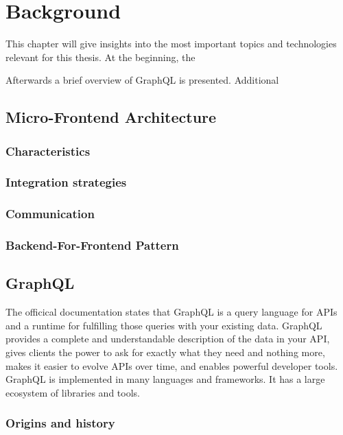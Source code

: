 \chapter{Background}

This chapter will give insights into the most important topics and technologies relevant for this thesis. At the beginning, the 

Afterwards a brief overview of GraphQL is presented. Additional

\section{Micro-Frontend Architecture}

\subsection{Characteristics}

\subsection{Integration strategies}

\subsection{Communication}

\subsection{Backend-For-Frontend Pattern}

\section{GraphQL}

The officical documentation states that GraphQL is a query language for APIs and a runtime for fulfilling those queries with your existing data. GraphQL provides a complete and understandable description of the data in your API, gives clients the power to ask for exactly what they need and nothing more, makes it easier to evolve APIs over time, and enables powerful developer tools. GraphQL is implemented in many languages and frameworks. It has a large ecosystem of libraries and tools.

\subsection{Origins and history}

